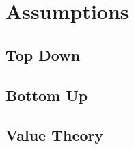 \section{Assumptions}\label{sec:assumptions}
\subsection{Top Down}\label{subsec:assumptions_top_down}

\subsection{Bottom Up}\label{subsec:assumptions_bottom_up}
\subsection{Value Theory}\label{subsec:assumptions_value_theory}

